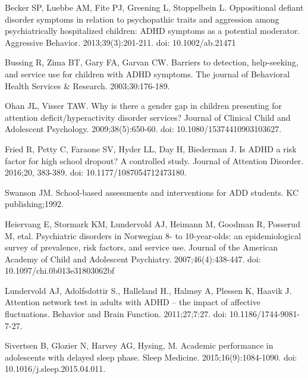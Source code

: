 \documentclass[10pt,letterpaper]{article}
\begin{document}
{\begin{thebibliography}{vancouver.bst}
Becker SP, Luebbe AM, Fite PJ, Greening L,
  Stoppelbein L.
\newblock Oppositional defiant disorder symptoms in relation to psychopathic
  traits and aggression among psychiatrically hospitalized children: {ADHD}
  symptoms as a potential moderator.
\newblock Aggressive Behavior. 2013;39(3):201-211. doi: 10.1002/ab.21471

Bussing R, Zima BT, Gary FA, Garvan CW.
\newblock Barriers to detection, help-seeking, and service use for children
  with {ADHD} symptoms.
\newblock The journal of Behavioral Health Services \& Research. 2003;30:176-189.



Ohan JL, Visser TAW.
\newblock Why is there a gender gap in children presenting for attention
  deficit/hyperactivity disorder services?
\newblock Journal of Clinical Child and Adolescent Psychology. 2009;38(5):650-60. doi: 10.1080/15374410903103627.



 Fried R, Petty C, Faraone SV, Hyder LL, Day H, Biederman J.
\newblock Is ADHD a risk factor for high school dropout? A controlled
study. 
 \newblock Journal of Attention Disorder. 2016;20, 383-389. doi: 10.1177/1087054712473180.
 
 
Swanson JM.
\newblock School-based assessments and interventions for ADD students. 
\newblock KC publishing;1992.
 
Heiervang E, Stormark KM, Lundervold AJ, Heimann M, Goodman R, Posserud M, etal.  
\newblock Psychiatric disorders in {N}orwegian 8- to 10-year-olds: an
  epidemiological survey of prevalence, risk factors, and service use.
\newblock Journal of the American Academy of Child and Adolescent
  Psychiatry. 2007;46(4):438-447. doi: 10.1097/chi.0b013e31803062bf
  
  
Lundervold AJ, Adolfsdottir S., Halleland H., Halm\o{}y A, 
  Plessen K, Haavik J.
\newblock Attention network test in adults with ADHD -- the impact of affective
  fluctuations.
\newblock Behavior and Brain Function. 2011;27;7:27.  doi: 10.1186/1744-9081-7-27.



Sivertsen B, Glozier N, Harvey AG, Hysing, M.
\newblock Academic performance in adolescents with delayed sleep phase.
\newblock Sleep Medicine. 2015;16(9):1084-1090. doi: 10.1016/j.sleep.2015.04.011.


\end{thebibliography}}
\end{document}
